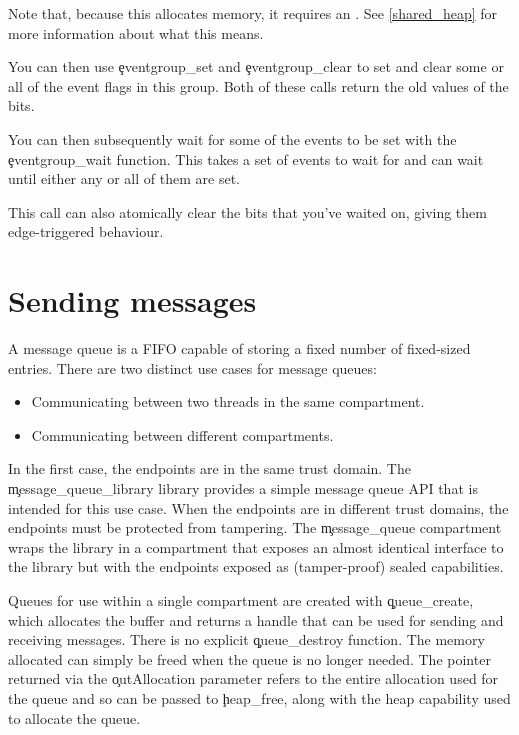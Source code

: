 
Note that, because this allocates memory, it requires an .
See \ref{shared_heap} for more information about what this means.

You can then use \c{eventgroup_set} and \c{eventgroup_clear} to set and clear some or all of the event flags in this group.
Both of these calls return the old values of the bits.



You can then subsequently wait for some of the events to be set with the \c{eventgroup_wait} function.
This takes a set of events to wait for and can wait until either any or all of them are set.


This call can also atomically clear the bits that you've waited on, giving them edge-triggered behaviour.

\section[label=message_queue]{Sending messages}

A message queue is a FIFO capable of storing a fixed number of fixed-sized entries.
There are two distinct use cases for message queues:

\begin{itemize}
	\item{Communicating between two threads in the same compartment.}
	\item{Communicating between different compartments.}
\end{itemize}

In the first case, the endpoints are in the same trust domain.
The \c{message_queue_library} library provides a simple message queue API that is intended for this use case.
When the endpoints are in different trust domains, the endpoints must be protected from tampering.
The \c{message_queue} compartment wraps the library in a compartment that exposes an almost identical interface to the library but with the endpoints exposed as (tamper-proof) sealed capabilities.

Queues for use within a single compartment are created with \c{queue_create}, which allocates the buffer and returns a handle that can be used for sending and receiving messages.
There is no explicit \c{queue_destroy} function.
The memory allocated can simply be freed when the queue is no longer needed.
The pointer returned via the \c{outAllocation} parameter refers to the entire allocation used for the queue and so can be passed to \c{heap_free}, along with the heap capability used to allocate the queue.

